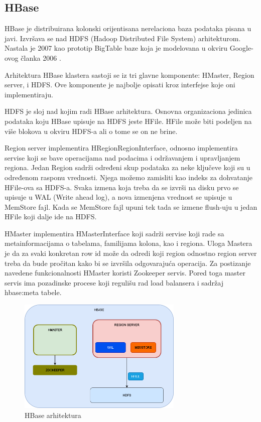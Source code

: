 \documentclass[12pt,oneside]{memoir}
\begin{document}
\subsection{HBase}

HBase je distribuirana kolonski orijentisana nerelaciona baza podataka  pisana u javi. Izvršava se nad HDFS (Hadoop Distributed File System) arhitekturom. Nastala je 2007 kao prototip BigTable baze koja je modelovana u okviru Google-ovog članka 2006 \cite{BigTable}. 

Arhitektura HBase klastera sastoji se iz tri glavne komponente: HMaster, Region server, i HDFS.  Ove komponente je najbolje opisati kroz interfejse koje oni implementiraju. 

HDFS je sloj nad kojim radi HBase arhitektura. Osnovna organizaciona jedinica podataka koju HBase upisuje na HDFS jeste HFile. HFile može biti podeljen na više blokova u okviru HDFS-a ali o tome se on ne brine. 

Region server implementira HRegionRegionInterface, odnosno implementira servise koji se bave operacijama nad podacima i održavanjem i upravljanjem regiona. Jedan Region sadrži određeni skup podataka za neke ključeve koji su u određenom rasponu vrednosti.  Njega možemo zamisliti kao indeks za dohvatanje HFile-ova sa HDFS-a.  Svaka izmena koja treba da se izvrši na disku prvo se upisuje u WAL (Write ahead log), a nova izmenjena vrednost se upisuje u MemStore fajl. Kada se MemStore fajl upuni tek tada se izmene flush-uju u jedan HFile koji dalje ide na HDFS. 

HMaster implementira HMasterInterface koji sadrži servise koji rade sa metainformacijama o tabelama, familijama kolona, kao i regiona. Uloga Mastera je da za svaki konkretan row id može da odredi koji region odnostno region server treba da bude pročitan kako bi se izvršila odgovarajuća operacija. Za postizanje navedene funkcionalnosti HMaster koristi Zookeeper \cite{BigTable} servis. Pored toga master servis ima pozadinske procese koji regulišu rad load balansera i sadržaj hbase:meta tabele.

\begin{figure}[!ht]
  \centering
  \includegraphics[width=0.7\textwidth]{hbase-arhitektura.png}
  \caption{HBase arhitektura}
  \label{fig:grafikon}
\end{figure}
\end{document}
